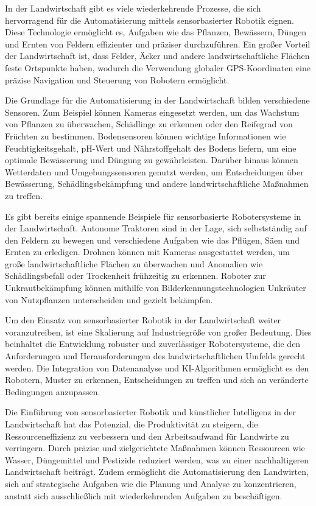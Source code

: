 In der Landwirtschaft gibt es viele wiederkehrende Prozesse, die sich
hervorragend für die Automatisierung mittels sensorbasierter Robotik eignen.
Diese Technologie ermöglicht es, Aufgaben wie das Pflanzen, Bewässern, Düngen
und Ernten von Feldern effizienter und präziser durchzuführen. Ein großer
Vorteil der Landwirtschaft ist, dass Felder, Äcker und andere
landwirtschaftliche Flächen feste Ortspunkte haben, wodurch die Verwendung
globaler GPS-Koordinaten eine präzise Navigation und Steuerung von Robotern
ermöglicht.

Die Grundlage für die Automatisierung in der Landwirtschaft bilden verschiedene
Sensoren. Zum Beispiel können Kameras eingesetzt werden, um das Wachstum von
Pflanzen zu überwachen, Schädlinge zu erkennen oder den Reifegrad von Früchten
zu bestimmen. Bodensensoren können wichtige Informationen wie
Feuchtigkeitsgehalt, pH-Wert und Nährstoffgehalt des Bodens liefern, um eine
optimale Bewässerung und Düngung zu gewährleisten. Darüber hinaus können
Wetterdaten und Umgebungssensoren genutzt werden, um Entscheidungen über
Bewässerung, Schädlingsbekämpfung und andere landwirtschaftliche Maßnahmen zu
treffen.

Es gibt bereits einige spannende Beispiele für sensorbasierte Robotersysteme in
der Landwirtschaft. Autonome Traktoren sind in der Lage, sich selbstständig auf
den Feldern zu bewegen und verschiedene Aufgaben wie das Pflügen, Säen und
Ernten zu erledigen. Drohnen können mit Kameras ausgestattet werden, um große
landwirtschaftliche Flächen zu überwachen und Anomalien wie Schädlingsbefall
oder Trockenheit frühzeitig zu erkennen. Roboter zur Unkrautbekämpfung können
mithilfe von Bilderkennungstechnologien Unkräuter von Nutzpflanzen
unterscheiden und gezielt bekämpfen.

Um den Einsatz von sensorbasierter Robotik in der Landwirtschaft weiter
voranzutreiben, ist eine Skalierung auf Industriegröße von großer Bedeutung.
Dies beinhaltet die Entwicklung robuster und zuverlässiger Robotersysteme, die
den Anforderungen und Herausforderungen des landwirtschaftlichen Umfelds
gerecht werden. Die Integration von Datenanalyse und KI-Algorithmen ermöglicht
es den Robotern, Muster zu erkennen, Entscheidungen zu treffen und sich an
veränderte Bedingungen anzupassen.

Die Einführung von sensorbasierter Robotik und künstlicher Intelligenz in der
Landwirtschaft hat das Potenzial, die Produktivität zu steigern, die
Ressourceneffizienz zu verbessern und den Arbeitsaufwand für Landwirte zu
verringern. Durch präzise und zielgerichtete Maßnahmen können Ressourcen wie
Wasser, Düngemittel und Pestizide reduziert werden, was zu einer nachhaltigeren
Landwirtschaft beiträgt. Zudem ermöglicht die Automatisierung den Landwirten,
sich auf strategische Aufgaben wie die Planung und Analyse zu konzentrieren,
anstatt sich ausschließlich mit wiederkehrenden Aufgaben zu beschäftigen.
